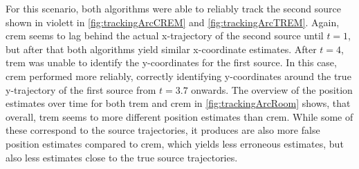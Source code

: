 For this scenario, both algorithms were able to reliably track the second source shown in violett in \autoref{fig:trackingArcCREM} and \autoref{fig:trackingArcTREM}. Again, \gls{crem} seems to lag behind the actual x-trajectory of the second source until $t=1$, but after that both algorithms yield similar x-coordinate estimates. After $t=4$, \gls{trem} was unable to identify the y-coordinates for the first source. In this case, \gls{crem} performed more reliably, correctly identifying y-coordinates around the true y-trajectory of the first source from $t=3.7$ onwards. The overview of the position estimates over time for both \gls{trem} and \gls{crem} in \autoref{fig:trackingArcRoom} shows, that overall, \gls{trem} seems to more different position estimates than \gls{crem}. While some of these correspond to the source trajectories, it produces are also more false position estimates compared to \gls{crem}, which yields less erroneous estimates, but also less estimates close to the true source trajectories.


\FloatBarrier

